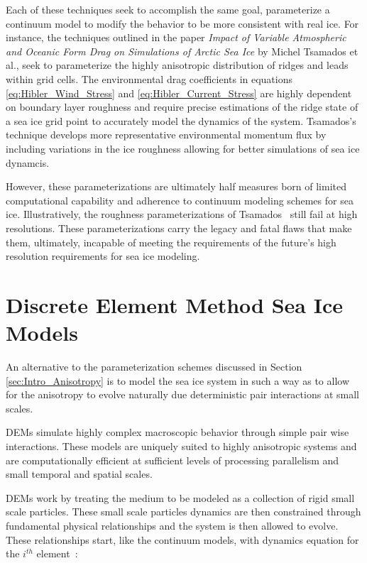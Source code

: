 Each of these techniques seek to accomplish the same goal, parameterize a continuum model to modify the behavior to be more consistent with real ice.  For instance, the techniques outlined in the paper \textit{Impact of Variable Atmospheric and Oceanic Form Drag on Simulations of Arctic Sea Ice} by Michel Tsamados et al., seek to parameterize the highly anisotropic distribution of ridges and leads within grid cells.  The environmental drag coefficients in equations \ref{eq:Hibler_Wind_Stress} and \ref{eq:Hibler_Current_Stress} are highly dependent on boundary layer roughness and require precise estimations of the ridge state of a sea ice grid point to accurately model the dynamics of the system.  Tsamados's technique develops more representative environmental momentum flux by including variations in the ice roughness allowing for better simulations of sea ice dynamcis.

However, these parameterizations are ultimately half measures born of limited computational capability and adherence to continuum modeling schemes for sea ice.  Illustratively, the roughness parameterizations of Tsamados~\citet{Tsamados2014} still fail at high resolutions.  These parameterizations carry the legacy and fatal flaws that make them, ultimately, incapable of meeting the requirements of the future's high resolution requirements for sea ice modeling.

\section{Discrete Element Method Sea Ice Models}
An alternative to the parameterization schemes discussed in Section \ref{sec:Intro_Anisotropy} is to model the sea ice system in such a way as to allow for the anisotropy to evolve naturally due deterministic pair interactions at small scales.

\acp{DEM} simulate highly complex macroscopic behavior through simple pair wise interactions.  These models are uniquely suited to highly anisotropic systems  and are computationally efficient at sufficient levels of processing parallelism and small temporal and spatial scales.

\acp{DEM} work by treating the medium to be modeled as a collection of rigid small scale particles.  These small scale particles dynamics are then constrained through fundamental physical relationships and the system is then allowed to evolve.  These relationships start, like the continuum models, with dynamics equation for the $i^{th}$ element~\citet{Herman2013}:


